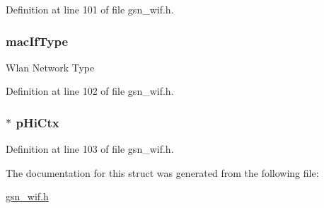 Definition at line 101 of file gsn\_\-wif.h.

\hypertarget{a00338_a3ee37b79013f1da93271b12024198eed}{
\subsubsection[{macIfType}]{ {\bf macIfType}}}
\label{a00338_a3ee37b79013f1da93271b12024198eed}
Wlan Network Type 

Definition at line 102 of file gsn\_\-wif.h.

\hypertarget{a00338_ab671e23204d79f8fda7dba9992c3d6e9}{
\subsubsection[{pHiCtx}]{$\ast$ {\bf pHiCtx}}}
\label{a00338_ab671e23204d79f8fda7dba9992c3d6e9}


Definition at line 103 of file gsn\_\-wif.h.



The documentation for this struct was generated from the following file:\begin{DoxyCompactItemize}
\item 
\hyperlink{a00605}{gsn\_\-wif.h}\end{DoxyCompactItemize}
